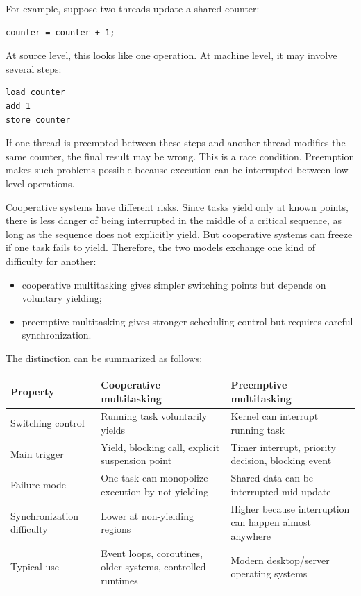 For example, suppose two threads update a shared counter:

\begin{verbatim}
counter = counter + 1;
\end{verbatim}

At source level, this looks like one operation. At machine level, it may involve several steps:

\begin{verbatim}
load counter
add 1
store counter
\end{verbatim}

If one thread is preempted between these steps and another thread modifies the same counter, the final result may be wrong. This is a race condition. Preemption makes such problems possible because execution can be interrupted between low-level operations.

Cooperative systems have different risks. Since tasks yield only at known points, there is less danger of being interrupted in the middle of a critical sequence, as long as the sequence does not explicitly yield. But cooperative systems can freeze if one task fails to yield. Therefore, the two models exchange one kind of difficulty for another:

\begin{itemize}
    \item cooperative multitasking gives simpler switching points but depends on voluntary yielding;
    \item preemptive multitasking gives stronger scheduling control but requires careful synchronization.
\end{itemize}

The distinction can be summarized as follows:

\begin{center}
\begin{tabular}{|p{}|p{}|p{}|}
\hline
\textbf{Property} & \textbf{Cooperative multitasking} & \textbf{Preemptive multitasking} \\
\hline
Switching control & Running task voluntarily yields & Kernel can interrupt running task \\
\hline
Main trigger & Yield, blocking call, explicit suspension point & Timer interrupt, priority decision, blocking event \\
\hline
Failure mode & One task can monopolize execution by not yielding & Shared data can be interrupted mid-update \\
\hline
Synchronization difficulty & Lower at non-yielding regions & Higher because interruption can happen almost anywhere \\
\hline
Typical use & Event loops, coroutines, older systems, controlled runtimes & Modern desktop/server operating systems \\
\hline
\end{tabular}
\end{center}

